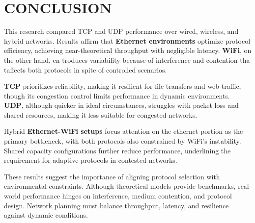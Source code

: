 \section{CONCLUSION} \label{sec:conclusion}

    This research compared TCP and UDP performance over wired, wireless, and hybrid networks. 
    Results affirm that \textbf{Ethernet environments} optimize protocol efficiency, achieving near-theoretical throughput with negligible latency. 
    \textbf{WiFi}, on the other hand, en-troduces variability because of interference and contention tha taffects both protocols in spite of controlled scenarios.
    
    \noindent
    \textbf{TCP} prioritizes reliability, making it resilient for file transfers and web traffic, though its congestion control limits performance in dynamic environments. 
    \textbf{UDP}, although quicker in ideal circumstances, struggles with packet loss and shared resources, making it less suitable for congested networks.

    \noindent
    Hybrid \textbf{Ethernet-WiFi setups} focus attention on the ethernet portion as the primary bottleneck, with both protocols also constrained by WiFi’s instability. 
    Shared capacity configurations further reduce performance, underlining the requirement for adaptive protocols in contested networks.

    \noindent
    These results suggest the importance of aligning protocol selection with environmental constraints. 
    Although theoretical models provide benchmarks, real-world performance hinges on interference, medium contention, and protocol design. 
    Network planning must balance throughput, latency, and resilience against dynamic conditions.

        

